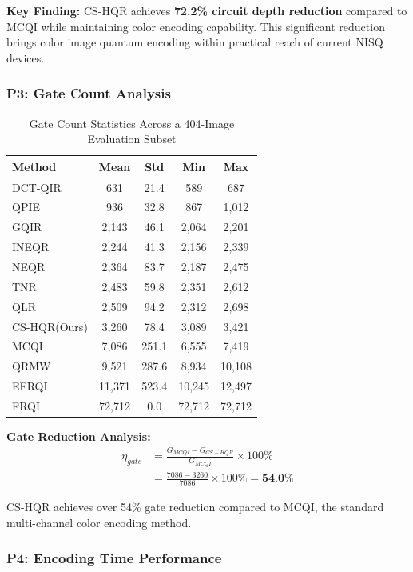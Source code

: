 \documentclass[11pt,a4paper]{article}
\begin{document}
\textbf{Key Finding:} CS-HQR achieves \textbf{72.2\% circuit depth reduction} compared to MCQI while maintaining color encoding capability. This significant reduction brings color image quantum encoding within practical reach of current NISQ devices.

\subsubsection{P3: Gate Count Analysis}

\begin{table}[H]
\centering
\caption{Gate Count Statistics Across a 404-Image Evaluation Subset}
\label{tab:gate_analysis}
\begin{tabular}{@{}lcccc@{}}
\toprule
\textbf{Method} & \textbf{Mean} & \textbf{Std} & \textbf{Min} & \textbf{Max} \\
\midrule
DCT-QIR & 631 & 21.4 & 589 & 687 \\
QPIE & 936 & 32.8 & 867 & 1,012 \\
GQIR & 2,143 & 46.1 & 2,064 & 2,201 \\
INEQR & 2,244 & 41.3 & 2,156 & 2,339 \\
NEQR & 2,364 & 83.7 & 2,187 & 2,475 \\
TNR & 2,483 & 59.8 & 2,351 & 2,612 \\
QLR & 2,509 & 94.2 & 2,312 & 2,698 \\
\rowcolor{green!15}
CS-HQR(Ours) & 3,260 & 78.4 & 3,089 & 3,421 \\
MCQI & 7,086 & 251.1 & 6,555 & 7,419 \\
QRMW & 9,521 & 287.6 & 8,934 & 10,108 \\
EFRQI & 11,371 & 523.4 & 10,245 & 12,497 \\
FRQI & 72,712 & 0.0 & 72,712 & 72,712 \\
\bottomrule
\end{tabular}
\end{table}

\textbf{Gate Reduction Analysis:}
\begin{align}
\eta_{gate} &= \frac{G_{MCQI} - G_{CS-HQR}}{G_{MCQI}} \times 100\% \nonumber\\
&= \frac{7086 - 3260}{7086} \times 100\% = \textbf{54.0\%}
\label{eq:gate_reduction_result}
\end{align}

CS-HQR achieves over 54\% gate reduction compared to MCQI, the standard multi-channel color encoding method.

\subsubsection{P4: Encoding Time Performance}
\end{document}
